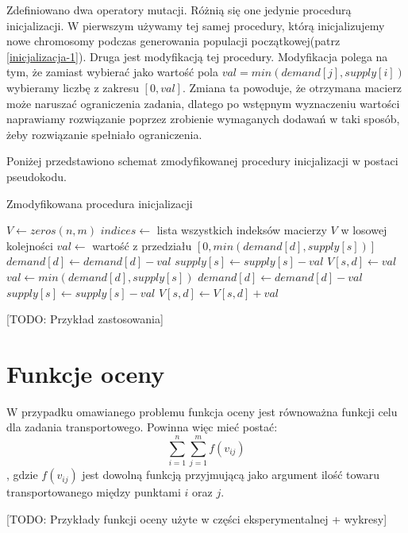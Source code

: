 Zdefiniowano dwa operatory mutacji. Różnią się one jedynie procedurą inicjalizacji. W pierwszym używamy tej samej procedury, którą inicjalizujemy 
nowe chromosomy podczas generowania populacji początkowej(patrz \ref{inicjalizacja-1}). Druga jest modyfikacją tej procedury. Modyfikacja polega na tym, że zamiast wybierać 
jako wartość pola $val = min(demand[j], supply[i])$ wybieramy liczbę z zakresu $[0, val]$. Zmiana ta powoduje, że otrzymana macierz może naruszać 
ograniczenia zadania, dlatego po wstępnym wyznaczeniu wartości naprawiamy rozwiązanie poprzez zrobienie wymaganych dodawań w taki sposób, żeby 
rozwiązanie spełniało ograniczenia. 

Poniżej przedstawiono schemat zmodyfikowanej procedury inicjalizacji w postaci pseudokodu.

\begin{pseudokod}[H]
    \label{inicjalizacja-2}
    \caption{Zmodyfikowana procedura inicjalizacji}
    \BlankLine
    $V \gets zeros(n, m)$
    $indices \gets$ lista wszystkich indeksów macierzy $V$ w losowej kolejności\;
    \BlankLine
     {
        $val \gets$ wartość z przedziału $[0, min(demand[d], supply[s])]$\;
        $demand[d] \gets demand[d] - val$\;
        $supply[s] \gets supply[s] - val$\;
        $V[s, d] \gets val$\;
    }
    \BlankLine
     {
        $val \gets min(demand[d], supply[s])$\;
        $demand[d] \gets demand[d] - val$\;
        $supply[s] \gets supply[s] - val$\;
        $V[s, d] \gets V[s, d] + val$\;
    }

\end{pseudokod}

[TODO: Przykład zastosowania]

\section{Funkcje oceny}
W przypadku omawianego problemu funkcja oceny jest równoważna funkcji celu dla zadania transportowego. Powinna więc mieć postać:
$$\sum_{i=1}^{n}\sum_{j=1}^{m} f(v_{ij})$$, 
gdzie $f(v_{ij})$ jest dowolną funkcją przyjmującą jako argument ilość towaru transportowanego między punktami $i$ oraz $j$.

[TODO: Przykłady funkcji oceny użyte w części eksperymentalnej + wykresy]

